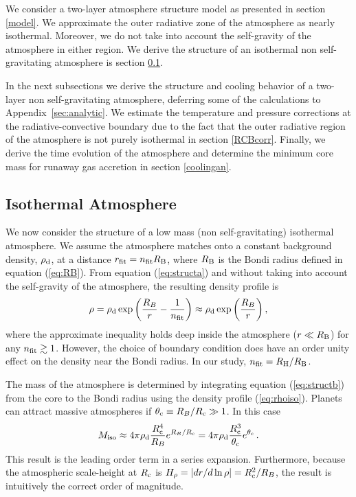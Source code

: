 \documentclass[apj]{emulateapj}
\newcommand{\App}[1]{Appendix~\ref{#1}}
\newcommand{\RB}{R_{\rm B}}
\newcommand{\co}{_{\rm c}}
\newcommand{\di}{_{\rm d}}
\begin{document}
We consider a two-layer atmosphere structure model as presented in section \ref{model}. We approximate the outer radiative zone of the atmosphere as nearly isothermal. Moreover, we do not take into account the self-gravity of the atmosphere in either region. We derive the structure of an isothermal non self-gravitating atmosphere is section \ref{iso}. 

In the next subsections we derive the structure and cooling behavior of a two-layer non self-gravitating atmosphere, deferring some of the calculations to \App{sec:analytic}. We estimate the temperature and pressure corrections at the radiative-convective boundary due to the fact that the outer radiative region of the atmosphere is not purely isothermal in section \ref{RCBcorr}. Finally, we derive the time evolution of the atmosphere and determine the minimum core mass for runaway gas accretion in section \ref{coolingan}.

\subsection{Isothermal Atmosphere}
\label{iso}

We now consider the structure of a low mass (non self-gravitating) isothermal atmosphere.  We assume the atmosphere matches onto a constant background density, $\rho_{\rm d}$, at a distance $r_{\rm fit} = n_{\rm fit} \RB$, where $R_{\rm B}$ is the Bondi radius defined in equation (\ref{eq:RB}). From equation (\ref{eq:structa}) and without taking into account the self-gravity of the atmosphere, the resulting density profile is
\begin{equation} \label{eq:rhoiso}
\rho = \rho_{\rm d} \exp \left({R_B \over r} - {1 \over n_{\rm{fit}}} \right) \approx   \rho_{\rm{d}} \exp \left(R_B \over r  \right),
\end{equation} 
where the approximate inequality holds deep inside the atmosphere ($r \ll \RB$) for any $n_{\rm fit} \gtrsim 1$.  However, the choice of boundary condition does have an order unity effect on the density near the Bondi radius. In our study, $n_{\rm{fit}}=R_{\rm H}/R_{\rm B}$.

The mass of the atmosphere is determined by integrating equation (\ref{eq:structb}) from the core to the Bondi radius using the density profile (\ref{eq:rhoiso}).  Planets can attract massive atmospheres if $\theta\co \equiv R_B/R\co \gg 1$.  In this case
\begin{equation} \label{eq:MatmISO}
M_{\rm iso} \approx 4 \pi \rho\di {R\co^4 \over R_B} e^{R_B/R\co} = 4 \pi \rho\di {R\co^3 \over \theta\co} e^{\theta\co}\, .
\end{equation} 
This result is the leading order term in a series expansion.  Furthermore, because the atmospheric scale-height at $R\co$ is $H_\rho = |dr /d\ln\rho| = R\co^2/R_B$, the result is intuitively the correct order of magnitude.
\end{document}
